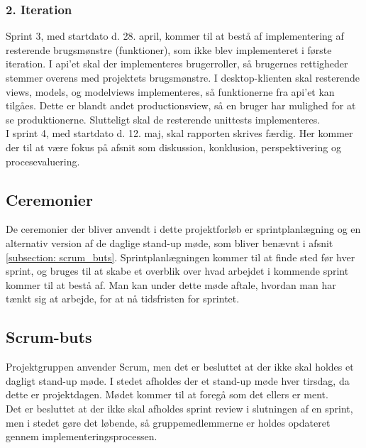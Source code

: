 \subsubsection{2. Iteration}
Sprint 3, med startdato d. 28. april,  kommer til at bestå af implementering af resterende brugsmønstre (funktioner), som ikke blev implementeret i første iteration. I api'et skal der implementeres brugerroller, så brugernes rettigheder stemmer overens med projektets brugsmønstre. I desktop-klienten skal resterende views, models, og modelviews implementeres, så funktionerne fra api'et kan tilgåes. Dette er blandt andet productionsview, så en bruger har mulighed for at se produktionerne. Slutteligt skal de resterende unittests implementeres.\\

I sprint 4, med startdato d. 12. maj, skal rapporten skrives færdig. Her kommer der til at være fokus på afsnit som diskussion, konklusion, perspektivering og procesevaluering.

\subsection{Ceremonier}
De ceremonier der bliver anvendt i dette projektforløb er sprintplanlægning og en alternativ version af de daglige stand-up møde, som bliver benævnt i afsnit \ref{subsection: scrum_buts}. Sprintplanlægningen kommer til at finde sted før hver sprint, og bruges til at skabe et overblik over hvad arbejdet i kommende sprint kommer til at bestå af. Man kan under dette møde aftale, hvordan man har tænkt sig at arbejde, for at nå tidsfristen for sprintet.

\subsection{Scrum-buts}{\label{subsection: scrum_buts}}
Projektgruppen anvender Scrum, men det er besluttet at der ikke skal holdes et dagligt stand-up møde. I stedet afholdes der et stand-up møde hver tirsdag, da dette er projektdagen. Mødet kommer til at foregå som det ellers er ment.\\

Det er besluttet at der ikke skal afholdes sprint review i slutningen af en sprint, men i stedet gøre det løbende, så gruppemedlemmerne er holdes opdateret gennem implementeringsprocessen. 